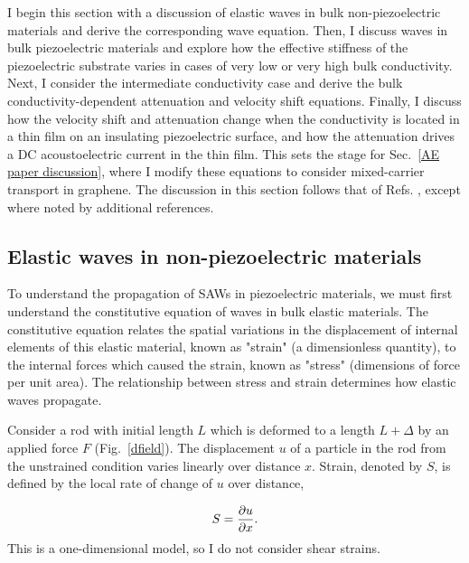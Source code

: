 \documentclass[double,12pt,1in,seploa]{beavtex}
\let\Oldsubsection\subsection
\renewcommand{\subsection}{\FloatBarrier\Oldsubsection}
\begin{document}
I begin this section with a discussion of elastic waves in bulk non-piezoelectric materials and derive the corresponding wave equation. Then, I discuss waves in bulk piezoelectric materials and explore how the effective stiffness of the piezoelectric substrate varies in cases of very low or very high bulk conductivity. Next, I consider the intermediate conductivity case and derive the bulk conductivity-dependent attenuation and velocity shift equations. Finally, I discuss how the velocity shift and attenuation change when the conductivity is located in a thin film on an insulating piezoelectric surface, and how the attenuation drives a DC acoustoelectric current in the thin film. This sets the stage for Sec.\ \ref{AE paper discussion}, where I modify these equations to consider mixed-carrier transport in graphene. The discussion in this section follows that of Refs. \cite{datta_surface_1986, weinreich_acoustodynamic_1956, hutson_elastic_1962, wixforth_surface_1989}, except where noted by additional references.

\subsection{Elastic waves in non-piezoelectric materials}
To understand the propagation of SAWs in piezoelectric materials, we must first understand the constitutive equation of waves in bulk elastic materials. The constitutive equation relates the spatial variations in the displacement of internal elements of this elastic material, known as "strain" (a dimensionless quantity), to the internal forces which caused the strain, known as "stress" (dimensions of force per unit area). The relationship between stress and strain determines how elastic waves propagate. 

Consider a rod with initial length $L$ which is deformed to a length $L + \Delta$ by an applied force $F$ (Fig.\ \ref{dfield}). The displacement $u$ of a particle in the rod from the unstrained condition varies linearly over distance $x$. Strain, denoted by $S$, is defined by the local rate of change of $u$ over distance, 

\begin{equation}
    S = \pdv{u}{x}. \label{strain-displacement equation}
\end{equation}
This is a one-dimensional model, so I do not consider shear strains.
\end{document}
